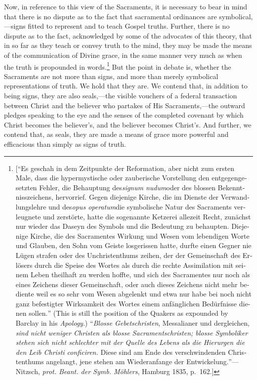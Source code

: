 \documentclass[
]{book}
\begin{document}
Now, in reference to this view of the Sacraments, it is necessary to bear in mind that there is no dispute as to the fact that sacramental ordinances are symbolical,---signs fitted to represent and to teach Gospel truths. Further, there is no dispute as to the fact, acknowledged by some of the advocates of this theory, that in so far as they teach or convey truth to the mind, they may be made the means of the communication of Divine grace, in the same manner very much as when the truth is propounded in words.\footnote{{[}``\foreignlanguage{ngerman}{Es geschah in dem Zeitpunkte der Reformation, aber nicht zum ersten Male, dass die hypermystische oder zauberische Vorstellung den entgegengesetzten Fehler, die Behauptung des}\foreignlanguage{latin}{\emph{signum nudum}}\foreignlanguage{ngerman}{oder des blossen Bekenntnisszeichens, hervorrief. Gegen diejenige Kirche, die im Dienste der Verwandlungslehre und des}\foreignlanguage{latin}{\emph{opus operatum}}\foreignlanguage{ngerman}{die symbolische Natur des Sacraments verleugnete und zerstörte, hatte die sogenannte Ketzerei allezeit Recht, zunächst nur wieder das Daseyn des Symbols und die Bedeutung zu behaupten. Diejenige Kirche, die des Sacramentes Wirkung und Wesen vom lebendigen Worte und Glauben, den Sohn vom Geiste losgerissen hatte, durfte einen Gegner nie Lügen strafen oder des Unchristenthums zeihen, der der Gemeinschaft des Erlösers durch die Speise des Wortes als durch die rechte Assimilation mit seinem Leben theilhaft zu werden hoffte, und sich des Sacramentes nur noch als eines Zeichens dieser Gemeinschaft, oder auch dieses Zeichens nicht mehr bediente weil es so sehr vom Wesen abgelenkt und etwa nur habe bei noch nicht ganz befestigter Wirksamkeit des Wortes einem anfänglichen Bedürfnisse dienen sollen.}'' (This is still the position of the Quakers as expounded by Barclay in his \emph{Apology}.) ``\foreignlanguage{ngerman}{\emph{Blosse Gebetschristen}, Messalianer und dergleichen, \emph{sind nicht weniger Christen als blosse Sacramentschristen; blosse Symboliker stehen sich nicht schlechter mit der Quelle des Lebens als die Hierurgen die den Leib Christi conficiren.} Diese sind am Ende des verschwindenden Christenthums angelangt, jene stehen am Wiederanfange der Entwickelung.}''---Nitzsch, \foreignlanguage{ngerman}{\emph{prot. Beant. der Symb. Möhlers}}, Hamburg 1835, p.~162.{]}} But the point in debate is, whether the Sacraments are not more than signs, and more than merely symbolical representations of truth. We hold that they are. We contend that, in addition to being signs, they are also seals,---the visible vouchers of a federal transaction between Christ and the believer who partakes of His Sacraments,---the outward pledges speaking to the eye and the senses of the completed covenant by which Christ becomes the believer's, and the believer becomes Christ's. And further, we contend that, as seals, they are made a means of grace more powerful and efficacious than simply as signs of truth.
\end{document}

